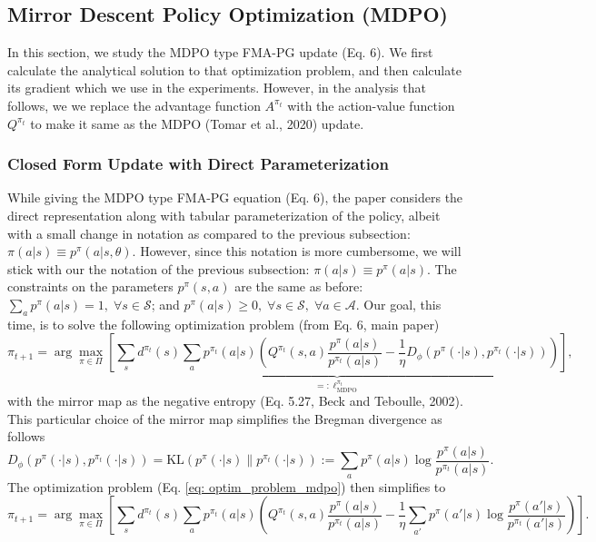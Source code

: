\documentclass[a4paper, 10pt]{article}
\begin{document}
\subsection{Mirror Descent Policy Optimization (MDPO)}
In this section, we study the MDPO type FMA-PG update (Eq. 6). We first calculate the analytical solution to that optimization problem, and then calculate its gradient which we use in the experiments. However, in the analysis that follows, we we replace the advantage function $A^{\pi_t}$ with the action-value function $Q^{\pi_t}$ to make it same as the MDPO (Tomar et al., 2020) update.
\subsubsection{Closed Form Update with Direct Parameterization}
While giving the MDPO type FMA-PG equation (Eq. 6), the paper considers the direct representation along with tabular parameterization of the policy, albeit with a small change in notation as compared to the previous subsection: $\pi(a|s) \equiv p^\pi(a|s, \theta)$. However, since this notation is more cumbersome, we will stick with our the notation of the previous subsection: $\pi(a|s) \equiv p^\pi(a|s)$. The constraints on the parameters $p^\pi(s, a)$ are the same as before: $\sum_a p^\pi(a | s) = 1, \; \forall s \in \mathcal{S}$; and $p^\pi(a | s) \geq 0, \; \forall s \in \mathcal{S}, \; \forall a \in \mathcal{A}$. Our goal, this time, is to solve the following optimization problem (from Eq. 6, main paper)
\begin{equation}
  \pi_{t+1} = \arg\max_{\pi \in \Pi} \underbrace{\left[ \sum_s d^{\pi_t}(s) \sum_a p^{\pi_t}(a|s) \left( Q^{\pi_t}(s, a) \frac{p^\pi(a | s)}{p^{\pi_t}(a | s)} - \frac{1}{\eta} D_\phi (p^\pi(\cdot | s), p^{\pi_t}(\cdot | s)) \right) \right]}_{=: \ell^{\pi_t}_{\text{MDPO}}}, \label{eq: optim_problem_mdpo}
\end{equation}
with the mirror map as the negative entropy (Eq. 5.27, Beck and Teboulle, 2002). This particular choice of the mirror map simplifies the Bregman divergence as follows
\begin{equation}
  D_\phi (p^\pi(\cdot | s), p^{\pi_t}(\cdot | s)) = \text{KL}(p^\pi(\cdot | s) \| p^{\pi_t}(\cdot | s)) := \sum_a p^\pi(a | s) \log \frac{p^\pi(a | s)}{p^{\pi_t}(a | s)}.
\end{equation}
The optimization problem (Eq. \ref{eq: optim_problem_mdpo}) then simplifies to
\begin{equation}
  \pi_{t+1} = \arg\max_{\pi \in \Pi} \left[ \sum_s d^{\pi_t}(s) \sum_a p^{\pi_t}(a|s) \left( Q^{\pi_t}(s, a) \frac{p^\pi(a | s)}{p^{\pi_t}(a | s)} - \frac{1}{\eta} \sum_{a'} p^\pi(a' | s) \log \frac{p^\pi(a' | s)}{p^{\pi_t}(a' | s)} \right) \right].
\end{equation}
\end{document}
